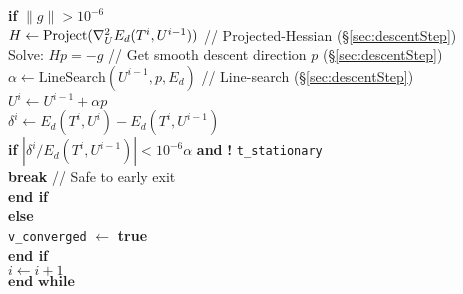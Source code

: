 \begin{algorithm}[h!]
\hspace{20pt}\textbf{if} $\|g\| > 10^{-6}$ \hspace{2pt} \\

\hspace{30pt} $H \leftarrow \text{Project}(\nabla_{\small{U}}^2 E_d(T^i,U^{i-1}))$ \hspace{10pt}// Projected-Hessian (\S\ref{sec:descentStep}) \\

\hspace{30pt} Solve: $H p = -g$ \hspace{10pt} // Get smooth descent direction $p$ (\S\ref{sec:descentStep}) \\

\hspace{30pt} $\alpha \leftarrow \text{LineSearch}(U^{i-1}, p, E_d)$ \hspace{10pt} // Line-search (\S\ref{sec:descentStep}) \\

\hspace{30pt} $U^{i} \leftarrow U^{i-1} + \alpha p$  \\
		
\hspace{30pt} $\delta^{i} \leftarrow E_{d}(T^i,U^{i}) - E_{d}(T^i,U^{i-1})$  \\

\hspace{30pt}\textbf{if} $|\delta^{i}/E_{d}(T^i,U^{i-1})| < 10^{-6}\alpha$ \textbf{and} \textbf{!}  \texttt{t\_stationary} \\
\hspace{40pt} \textbf{break} \hspace{10pt} // Safe to early exit \\
\hspace{30pt} \textbf{end if} \\

\hspace{20pt} \textbf{else}  \\
\hspace{30pt} \texttt{v\_converged} $\leftarrow $ \textbf{true} \\
\hspace{20pt} \textbf{end if} \\

\hspace{20pt} $i \leftarrow i + 1$ \\

\hspace{10pt} $\textbf{end while}$ \\


\end{algorithm}
